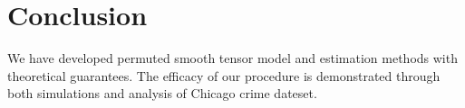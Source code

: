 \documentclass{article}
\theoremstyle{definition}
\begin{document}


\vspace{-.4cm}
\section{Conclusion}\label{sec:con}
\vspace{-.4cm}
We have developed permuted smooth tensor model and estimation methods with theoretical guarantees. 
The efficacy of our procedure is demonstrated through both simulations and analysis of Chicago crime dateset. 




\end{document}
